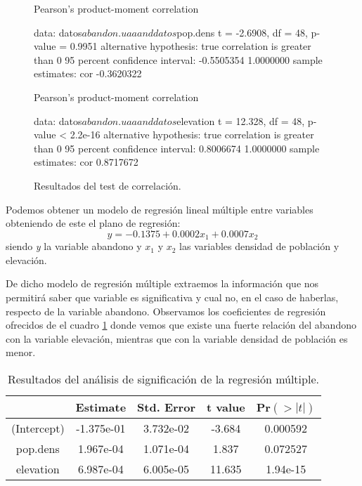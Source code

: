 \documentclass[11pt,a4paper]{article}
\begin{document}
\begin{figure}
\centering
\begin{boxedverbatim}
    Pearson's product-moment correlation

data:  datos$abandon.uaa and datos$pop.dens
t = -2.6908, df = 48, p-value = 0.9951
alternative hypothesis: true correlation is greater than 0
95 percent confidence interval:
 -0.5505354  1.0000000
sample estimates:
       cor 
-0.3620322
\end{boxedverbatim}

\begin{boxedverbatim}
    Pearson's product-moment correlation

data:  datos$abandon.uaa and datos$elevation
t = 12.328, df = 48, p-value < 2.2e-16
alternative hypothesis: true correlation is greater than 0
95 percent confidence interval:
 0.8006674 1.0000000
sample estimates:
       cor 
0.8717672 
\end{boxedverbatim}
\caption{Resultados del test de correlación.}
\label{fig:res.corr}
\end{figure}

Podemos obtener un modelo de regresión lineal múltiple entre variables obteniendo de este el plano de regresión:
\begin{equation}
y=-0.1375+0.0002x_{1}+0.0007x_{2}
\label{eq:regre.multi}
\end{equation}
\noindent siendo \textit{y} la variable abandono y $x_{1}$ y $x_2$ las variables densidad de población y elevación.

De dicho modelo de regresión múltiple extraemos la información que nos permitirá saber que variable es significativa y cual no, en el caso de haberlas, respecto de la variable abandono. Observamos los coeficientes de regresión ofrecidos de el cuadro \ref{tab:coef.multi} donde vemos que existe una fuerte relación del abandono con la variable elevación, mientras que con la variable densidad de población es menor.

\begin{table}
\centering
\begin{tabular}{ccccc}
\toprule[0.4mm]
& Estimate & Std. Error & t value & Pr$(>|t|)$\\
\midrule
(Intercept) & -1.375e-01 & 3.732e-02 & -3.684 & 0.000592\\
pop.dens & 1.967e-04 & 1.071e-04 & 1.837 & 0.072527\\
elevation & 6.987e-04 & 6.005e-05 & 11.635 & 1.94e-15\\
\bottomrule[0.4mm]
\end{tabular}
\caption{Resultados del análisis de significación de la regresión múltiple.}
\label{tab:coef.multi}
\end{table}
\end{document}
